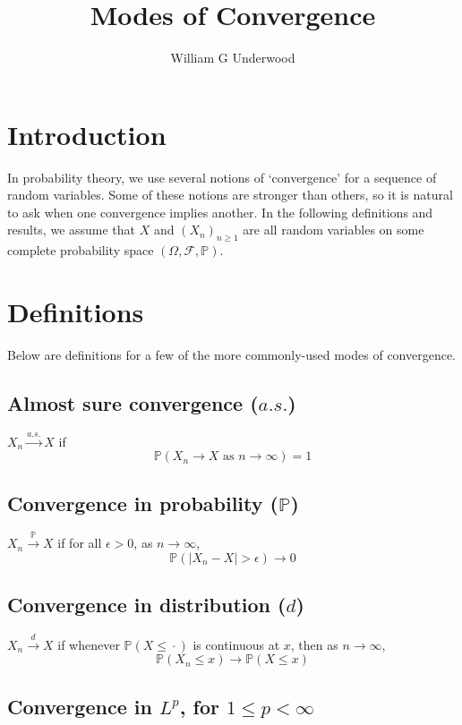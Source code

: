 \documentclass{article}
\title{Modes of Convergence}
\author{William G Underwood}
\begin{document}
\maketitle

\section{Introduction}

In probability theory, we use several notions of `convergence' for
a sequence of random variables.
Some of these notions are stronger than others, so it is natural to ask
when one convergence implies another.
In the following definitions and results, we assume that $X$ and $(X_n)_{n \geq 1}$ are all
random variables on some complete probability space $(\Omega, \mathcal{F}, \mathbb{P})$.


\section{Definitions}

Below are definitions for a few of the more
commonly-used modes of convergence.

\subsection*{Almost sure convergence ($a.s.$)}

$X_n \xrightarrow{a.s.} X$
if
$$\mathbb{P}(X_n \to X \text{ as } n \to \infty) = 1$$

\subsection*{Convergence in probability ($\mathbb{P}$)}

$X_n \xrightarrow{\mathbb{P}} X$
if for all $\epsilon > 0$,
as $n \to \infty$,
$$\mathbb{P}(|X_n - X| > \epsilon) \to 0$$

\subsection*{Convergence in distribution ($d$)}

$X_n \xrightarrow{d} X$
if whenever $\mathbb{P}(X \leq \,\boldsymbol{\cdot}\,)$ is continuous at $x$,
then as $n \to \infty$,
$$\mathbb{P}(X_n \leq x) \to \mathbb{P}(X \leq x)$$

\subsection*{Convergence in $L^p$, for $1 \leq p < \infty$}
\end{document}
